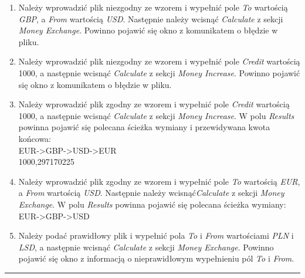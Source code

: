 \documentclass[a4paper,11pt]{article}
\newcommand{\linia}{\rule{\linewidth}{0.4mm}}
\begin{document}
\begin{enumerate}
\item Należy wprowadzić plik niezgodny ze wzorem i wypełnić pole \textit{To} wartością \textit{GBP}, a \textit{From} wartością \textit{USD}. Następnie należy wcisnąć \textit{Calculate} z sekcji \textit{Money Exchange}. Powinno pojawić się okno z komunikatem o błędzie w pliku.
\item Należy wprowadzić plik niezgodny ze wzorem i wypełnić pole \textit{Credit} wartością 1000, a następnie wcisnąć \textit{Calculate} z sekcji \textit{Money Increase}. Powinno pojawić się okno z komunikatem o błędzie w pliku.
\item Należy wprowadzić plik zgodny ze wzorem i wypełnić pole \textit{Credit} wartością 1000, a następnie wcisnąć \textit{Calculate} z sekcji \textit{Money Increase}. W polu \textit{Results} powinna pojawić się polecana ścieżka wymiany i przewidywana kwota końcowa:
\\EUR->GBP->USD->EUR
\\1000,297170225
\item Należy wprowadzić plik zgodny ze wzorem i wypełnić pole \textit{To} wartością \textit{EUR}, a \textit{From} wartością \textit{USD}. Następnie należy wcisnąć\textit{Calculate} z sekcji \textit{Money Exchange}. W polu \textit{Results} powinna pojawić się polecana ścieżka wymiany:
\\EUR->GBP->USD
\item Należy podać prawidłowy plik i wypełnić pola \textit{To} i \textit{From} wartościami \textit{PLN} i \textit{LSD}, a następnie wcisnąć \textit{Calculate} z sekcji \textit{Money Exchange}. Powinno pojawić się okno z informacją o nieprawidłowym wypełnieniu pól \textit{To} i \textit{From}.
\end{enumerate}
\noindent\linia
\end{document}
